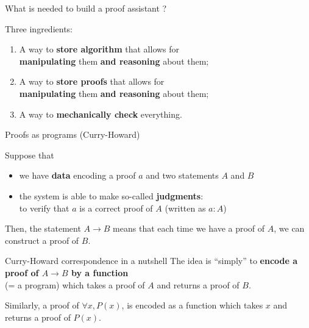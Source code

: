 \documentclass[compress,11pt]{beamer}
\newcommand{\red}[1]{{\color{red} #1}}
\begin{document}
\begin{frame}{What is needed to build a proof assistant ?}

Three ingredients:
\begin{enumerate}
\item A way to \textbf{\red{store algorithm}} that allows for\\
  \textbf{manipulating} them \textbf{and reasoning} about them;
\bigskip\pause

\item A way to \textbf{\red{store proofs}} that allows for\\
  \textbf{manipulating} them \textbf{and reasoning} about them;
\bigskip\pause

\item A way to \textbf{mechanically check} everything.
\end{enumerate}
\end{frame}

\begin{frame}{Proofs as programs (Curry-Howard)}

Suppose that
\begin{itemize}
\item we have \textbf{data} encoding a proof $a$ and two statements $A$ and
  $B$
\item the system is able to make so-called \textbf{judgments}: \\
  to verify that $a$ is a correct proof of $A$ (written as $a : A$)
\end{itemize}
\pause\medskip

Then, the statement $A \to B$ means that each time we have a proof of $A$, we
can construct a proof of $B$.
\pause\bigskip

\begin{block}{Curry-Howard correspondence in a nutshell}
  The idea is ``simply'' to \textbf{encode a proof of $A \to B$ by a function}\\
  (= a program) which takes a proof of $A$ and returns a proof of $B$.
  \bigskip\pause

  Similarly, a proof of $\forall x, P(x)$, is encoded as a function which
  takes $x$ and returns a proof of $P(x)$.
\end{block}


\end{frame}
\end{document}
